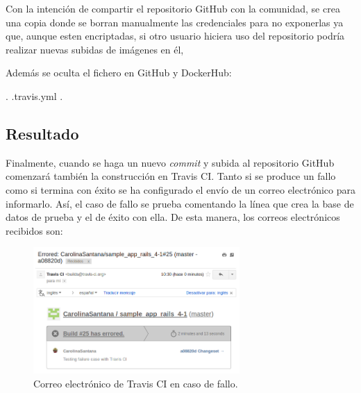 Con la intención de compartir el repositorio GitHub con la comunidad, se crea una copia donde se borran manualmente las credenciales  para no exponerlas ya que, aunque esten encriptadas, si otro usuario hiciera uso del repositorio podría realizar nuevas subidas de imágenes en él, 

Además se oculta el fichero  en GitHub y DockerHub:

\begin{codelisting}
\label{code:scriptdocker}
\begin{code}
.
.travis.yml
.
\end{code}
\end{codelisting}

\subsection{Resultado}

Finalmente, cuando se haga un nuevo \textit{commit} y subida al repositorio GitHub comenzará también la construcción en Travis CI. Tanto si se produce un fallo como si termina con éxito se ha configurado el envío de un correo electrónico para informarlo. Así, el caso de fallo se prueba comentando la línea que crea la base de datos de prueba  y el de éxito con ella. De esta manera, los correos electrónicos recibidos son:

\begin{figure}[H]
\centering
\includegraphics[width=0.7\textwidth]{images/figures/travisfailure.png}
\caption{Correo electrónico de Travis CI en caso de fallo.}
\end{figure}

